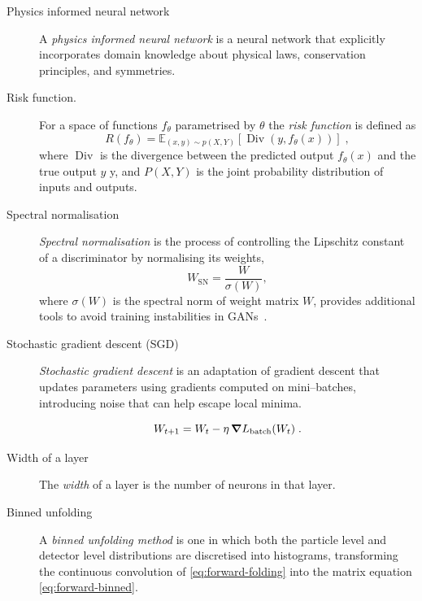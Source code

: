 \begin{description}
\item [Physics informed neural network]
    A \emph{physics informed neural network} is a neural network that explicitly incorporates domain knowledge about physical laws, conservation principles, and symmetries.

\item [Risk function.]
            For a space of functions \(f_\theta\) parametrised by \(\theta\) the \emph{risk function} is defined as 
            \begin{equation}
                {R}(f_\theta) = \mathbb{E}_{(x,y) \sim p(X,Y)}[\operatorname{Div}(y, f_\theta(x))]\;,
            \end{equation}
            where \(\operatorname{Div}\) is the divergence between the predicted output \(f_\theta(x)\) and the true output \(y\) y, and \(P(X,Y)\) is the joint probability distribution of inputs and outputs.

\item [Spectral normalisation]
        \emph{Spectral normalisation} is the process of controlling the Lipschitz constant of a discriminator by normalising its weights,
        \begin{equation}
            W_{\text{SN}} = \frac{W}{\sigma(W)},
        \end{equation}
        where \(\sigma(W)\) is the spectral norm of weight matrix \(W\), provides additional tools to avoid training instabilities in GANs~\cite{Terjek2019AdversarialRegularization, miyato_spectral_2018}.

\item [Stochastic gradient descent (SGD)]
            
            \emph{Stochastic gradient descent} is an adaptation of gradient descent that updates parameters using gradients computed on mini--batches, introducing noise that can help escape local minima.
            
            \begin{equation}
            W_{t+1} = W_t - \eta\, \grad L_{\text{batch}}(W_t)\;.
            \end{equation}

\item [Width of a layer]
            The \emph{width} of a layer is the number of neurons in that layer.

\item [Binned unfolding]
    A \emph{binned unfolding method} is one in which both the particle level and detector level distributions are discretised into histograms, transforming the continuous convolution of \cref{eq:forward-folding} into the matrix equation \cref{eq:forward-binned}.


\end{description}
